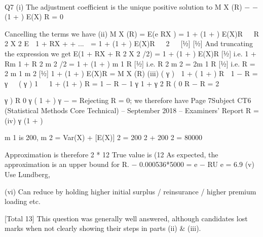 \documentclass[a4paper,12pt]{article}
\begin{document}


Q7
(i)
The adjustment coefficient is the unique positive solution to
\lambda M X (R) − \lambda  − \lambda (1 + \theta ) E(X) R = 0

Cancelling the \lambda  terms we have
(ii)
M X (R) = E(e RX ) = 1 + (1 + \theta ) E(X)R


R 2 X 2
E  1 + RX +
+ ...  = 1 + (1 + \theta ) E(X)R


2


[1⁄2]
[1⁄2]
And truncating the expression we get
E(1 + RX + R 2 X 2 /2) = 1 + (1 + \theta ) E(X)R [1⁄2]
i.e. 1 + Rm 1 + R 2 m 2 /2 = 1 + (1 + \theta ) m 1 R [1⁄2]
i.e. R 2 m 2 = 2\theta m 1 R [1⁄2]
i.e. R =
2 \theta  m 1
m 2
[1⁄2]
1 + (1 + \theta ) E(X)R = M X (R)
(iii)
( γ )
 1 + ( 1 + \theta  ) R  1 − R =
γ   (
γ ) 1
 
1 + (1 + \theta  ) R = 1 − R
− 1
γ
1 + \theta 
γ 2
R
(
0
R − \theta  R =
2

γ
)
R
0
γ ( 1 + \theta  ) γ − \theta  =
Rejecting R = 0; we therefore have
Page 7Subject CT6 (Statistical Methods Core Technical) – September 2018 – Examiners’ Report
R =
(iv)
\theta γ
(1 + \theta  )

m 1 is 200, m 2 = Var(X) + [E(X)] 2 = 200 2 + 200 2 = 80000

Approximation is therefore 2 * 12%
True value is (12%
As expected, the approximation is an upper bound for R.
− 0.000536*5000
=
e − RU e =
6.9%
(v) Use Lundberg, 

(vi) Can reduce by holding higher initial surplus / reinsurance / higher premium
loading etc.

[Total 13]
This question was generally well answered, although candidates lost marks when not clearly
showing their steps in parts (ii) & (iii).
\end{document}
